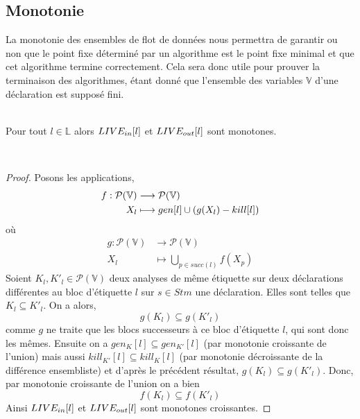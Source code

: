 \documentclass[a4paper, 10pt]{article}
\begin{document}
\subsection{Monotonie}
La monotonie des ensembles de flot de données nous permettra de garantir ou non que le point fixe déterminé par un
algorithme est le point fixe minimal et que cet algorithme termine correctement.
Cela sera donc utile pour prouver la terminaison des algorithmes, étant donné que l'ensemble des variables $\mathbb{V}$ d'une déclaration est supposé fini.
\\
\\
\begin{lemma}
	Pour tout $l \in \mathbb{L}$ alors $LIVE_{in}[l]$ et $LIVE_{out}[l]$ sont monotones.
\end{lemma}
\\
\begin{proof}	
Posons les applications,
\begin{align*}
	f : \mathcal{P}(\mathbb{V}) &\longrightarrow \mathcal{P}(\mathbb{V}) \\
	X_l &\longmapsto gen[l] \cup (g(X_l) - kill[l])
\end{align*}
où
\begin{align*}
	g : \mathcal{P}(\mathbb{V}) &\longrightarrow \mathcal{P}(\mathbb{V})\\
	X_l &\longmapsto \bigcup\limits_{p\in succ(l)} f(X_p)
\end{align*}
Soient $K_l, K'_l \in \mathcal{P}(\mathbb{V})$ deux analyses de même étiquette sur deux déclarations différentes au bloc
d'étiquette $l$ sur $s \in Stm$ une déclaration. Elles sont telles que $K_l \subseteq K'_l$. On a alors,
\[
	g(K_l) \subseteq g(K'_l)
\]
comme $g$ ne traite que les blocs successeurs à ce bloc d'étiquette $l$, qui sont donc les mêmes.
Ensuite on a $gen_K[l] \subseteq gen_{K'}[l]$ (par monotonie croissante de l'union) mais aussi $kill_{K'}[l] \subseteq kill_K[l]$ (par monotonie décroissante
de la différence ensembliste) et d'après le précédent
résultat, $g(K_l) \subseteq g(K'_l)$. Donc, par monotonie croissante de l'union on a bien
\[
	f(K_l) \subseteq f(K'_l)	
\]
Ainsi $LIVE_{in}[l]$ et $LIVE_{out}[l]$ sont monotones croissantes.
\end{proof}
\end{document}
